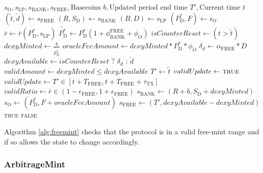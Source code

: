 \documentclass{ifcolog}
\newcommand{\Pdt}{P_{\mathrm{D}}^{*}}
\newcommand{\Sd}{S_{\mathrm{D}}}
\newcommand{\rr}{\bar{r}}
\newcommand{\sbank}{s_{\textrm{BANK}}}
\newcommand{\slp}{s_{\mathrm{LP}}}
\newcommand{\soracle}{s_{\textrm{O}}}
\newcommand{\sfree}{s_{\textrm{FREE}}}
\newcommand{\tautx}{\tau_{\textrm{TX}}}
\newcommand{\epsilonfree}{\epsilon_{\textrm{FREE}}}
\begin{document}
\begin{algorithm}[H]
\caption{FreeMint}\label{alg:freemint}
\begin{algorithmic}[1]
  \Require $\soracle, \slp, \sbank, \sfree, \textrm{Basecoins } b, \textrm{Updated period end time } T', \textrm{Current time } t$
  \State $(\tilde{t}, \tilde{d}) \gets \sfree$
  \State $(R, \Sd) \gets \sbank$
  \State $(B, D) \gets \slp$
  \State $(\Pdt, F) \gets \soracle$  
  \State $\rr \gets \rr(\Pdt, \slp) $
  \State $\tilde{\Pdt} \gets \Pdt(1 + \phi_{\textrm{BANK}}^{\textrm{FREE}} + \phi_{O})$
  \State $isCounterReset \gets (t > \tilde{t})$ 
  \State $dexyMinted \gets \frac{b}{\tilde{\Pdt}}$
  \State $oracleFeeAmount \gets dexyMinted * \Pdt * \phi_{O}$
  \State $\delta_{d} \gets \alpha_{\textrm{FREE}} * D$ 
  \State $dexyAvailable \gets isCounterReset \textrm{ ? } \delta_{d} \textrm{ : } \tilde{d}$
  \State $validAmount \gets dexyMinted \le dexyAvailable$
    \State $T' \gets \tilde{t}$
    \State $validUpdate \gets \textsc{true}$
  \Else 
    \State $validUpdate \gets T' \in [t + T_{\textrm{FREE}}, t + T_{\textrm{FREE}} + \tautx]$  
  \EndIf
  \State $validRatio \gets \rr \in (1-\epsilonfree, 1 + \epsilonfree)$
    \State $\sbank \gets (R + b, \Sd + dexyMinted)$
    \State $\soracle \gets (\Pdt, F + oracleFeeAmount)$
    \State $\sfree \gets (T', dexyAvailable - dexyMinted)$
    \State \Return \textsc{true}
  \Else
    \State \Return \textsc{false}
  \EndIf
\end{algorithmic}
\end{algorithm}
 
Algorithm \ref{alg:freemint} checks that the protocol is in a valid free-mint range and if so allows the state to change accordingly.

\newpage

\subsubsection{ArbitrageMint}
\end{document}
